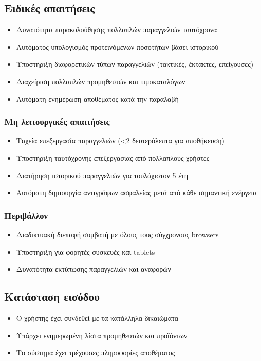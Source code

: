 \documentclass[12pt,a4paper,twoside]{book}
\begin{document}
\subsection{Ειδικές απαιτήσεις} %
\begin{itemize}
  \item Δυνατότητα παρακολούθησης πολλαπλών παραγγελιών ταυτόχρονα
  \item Αυτόματος υπολογισμός προτεινόμενων ποσοτήτων βάσει ιστορικού
  \item Υποστήριξη διαφορετικών τύπων παραγγελιών (τακτικές, έκτακτες, επείγουσες) %
  \item Διαχείριση πολλαπλών προμηθευτών και τιμοκαταλόγων
  \item Αυτόματη ενημέρωση αποθέματος κατά την παραλαβή
\end{itemize}

\subsubsection{Μη λειτουργικές απαιτήσεις}
\begin{itemize}
  \item Ταχεία επεξεργασία παραγγελιών (<2 δευτερόλεπτα για αποθήκευση) %
  \item Υποστήριξη ταυτόχρονης επεξεργασίας από πολλαπλούς χρήστες
  \item Διατήρηση ιστορικού παραγγελιών για τουλάχιστον 5 έτη
  \item Αυτόματη δημιουργία αντιγράφων ασφαλείας μετά από κάθε σημαντική ενέργεια %
\end{itemize}

\subsubsection{Περιβάλλον}
\begin{itemize}
  \item Διαδικτυακή διεπαφή συμβατή με όλους τους σύγχρονους browsers %
  \item Υποστήριξη για φορητές συσκευές και tablets
  \item Δυνατότητα εκτύπωσης παραγγελιών και αναφορών
\end{itemize}

\subsection{Κατάσταση εισόδου} %
\begin{itemize}
  \item Ο χρήστης έχει συνδεθεί με τα κατάλληλα δικαιώματα %
  \item Υπάρχει ενημερωμένη λίστα προμηθευτών και προϊόντων
  \item Το σύστημα έχει τρέχουσες πληροφορίες αποθέματος
\end{itemize}
\end{document}
